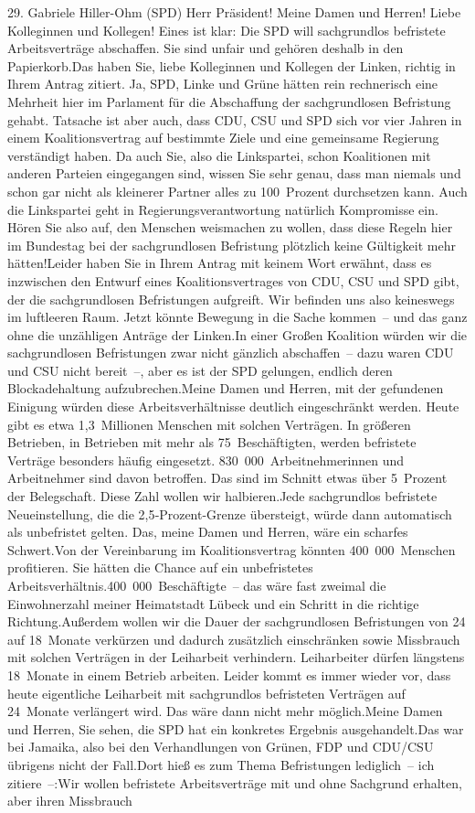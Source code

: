 \documentclass{article}
\begin{document}
	29. Gabriele Hiller-Ohm (SPD) Herr Präsident! Meine Damen und Herren! Liebe Kolleginnen und Kollegen! Eines ist klar: Die SPD will sachgrundlos befristete Arbeitsverträge abschaffen. Sie sind unfair und gehören deshalb in den Papierkorb.Das haben Sie, liebe Kolleginnen und Kollegen der Linken, richtig in Ihrem Antrag zitiert. Ja, SPD, Linke und Grüne hätten rein rechnerisch eine Mehrheit hier im Parlament für die Abschaffung der sachgrundlosen Befristung gehabt. Tatsache ist aber auch, dass CDU, CSU und SPD sich vor vier Jahren in einem Koalitionsvertrag auf bestimmte Ziele und eine gemeinsame Regierung verständigt haben. Da auch Sie, also die Linkspartei, schon Koalitionen mit anderen Parteien eingegangen sind, wissen Sie sehr genau, dass man niemals und schon gar nicht als kleinerer Partner alles zu 100 Prozent durchsetzen kann. Auch die Linkspartei geht in Regierungsverantwortung natürlich Kompromisse ein. Hören Sie also auf, den Menschen weismachen zu wollen, dass diese Regeln hier im Bundestag bei der sachgrundlosen Befristung plötzlich keine Gültigkeit mehr hätten!Leider haben Sie in Ihrem Antrag mit keinem Wort erwähnt, dass es inzwischen den Entwurf eines Koalitionsvertrages von CDU, CSU und SPD gibt, der die sachgrundlosen Befristungen aufgreift. Wir befinden uns also keineswegs im luftleeren Raum. Jetzt könnte Bewegung in die Sache kommen – und das ganz ohne die unzähligen Anträge der Linken.In einer Großen Koalition würden wir die sachgrundlosen Befristungen zwar nicht gänzlich abschaffen – dazu waren CDU und CSU nicht bereit –, aber es ist der SPD gelungen, endlich deren Blockadehaltung aufzubrechen.Meine Damen und Herren, mit der gefundenen Einigung würden diese Arbeitsverhältnisse deutlich eingeschränkt werden. Heute gibt es etwa 1,3 Millionen Menschen mit solchen Verträgen. In größeren Betrieben, in Betrieben mit mehr als 75 Beschäftigten, werden befristete Verträge besonders häufig eingesetzt. 830 000 Arbeitnehmerinnen und Arbeitnehmer sind davon betroffen. Das sind im Schnitt etwas über 5 Prozent der Belegschaft. Diese Zahl wollen wir halbieren.Jede sachgrundlos befristete Neueinstellung, die die 2,5‑Prozent-Grenze übersteigt, würde dann automatisch als unbefristet gelten. Das, meine Damen und Herren, wäre ein scharfes Schwert.Von der Vereinbarung im Koalitionsvertrag könnten 400 000 Menschen profitieren. Sie hätten die Chance auf ein unbefristetes Arbeitsverhältnis.400 000 Beschäftigte – das wäre fast zweimal die Einwohnerzahl meiner Heimatstadt Lübeck und ein Schritt in die richtige Richtung.Außerdem wollen wir die Dauer der sachgrundlosen Befristungen von 24 auf 18 Monate verkürzen und dadurch zusätzlich einschränken sowie Missbrauch mit solchen Verträgen in der Leiharbeit verhindern. Leiharbeiter dürfen längstens 18 Monate in einem Betrieb arbeiten. Leider kommt es immer wieder vor, dass heute eigentliche Leiharbeit mit sachgrundlos befristeten Verträgen auf 24 Monate verlängert wird. Das wäre dann nicht mehr möglich.Meine Damen und Herren, Sie sehen, die SPD hat ein konkretes Ergebnis ausgehandelt.Das war bei Jamaika, also bei den Verhandlungen von Grünen, FDP und CDU/CSU übrigens nicht der Fall.Dort hieß es zum Thema Befristungen lediglich – ich zitiere –:Wir wollen befristete Arbeitsverträge mit und ohne Sachgrund erhalten, aber ihren Missbrauch 
\end{document}
